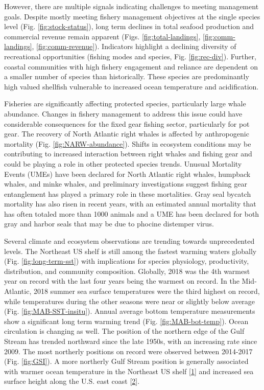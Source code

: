 \documentclass[10pt,]{article}
\begin{document}
However, there are multiple signals indicating challenges to meeting
management goals. Despite mostly meeting fishery management objectives
at the single species level (Fig. \ref{fig:stock-status}), long term
declines in total seafood production and commercial revenue remain
apparent (Figs. \ref{fig:total-landings}, \ref{fig:comm-landings},
\ref{fig:comm-revenue}). Indicators highlight a declining diversity of
recreational opportunities (fishing modes and species, Fig.
\ref{fig:rec-div}). Further, coastal communities with high fishery
engagement and reliance are dependent on a smaller number of species
than historically. These species are predominantly high valued shellfish
vulnerable to increased ocean temperature and acidification.

Fisheries are significantly affecting protected species, particularly
large whale abundance. Changes in fishery management to address this
issue could have considerable consequences for the fixed gear fishing
sector, particularly for pot gear. The recovery of North Atlantic right
whales is affected by anthropogenic mortality (Fig.
\ref{fig:NARW-abundance}). Shifts in ecosystem conditions may be
contributing to increased interaction between right whales and fishing
gear and could be playing a role in other protected species trends.
Unusual Mortality Events (UMEs) have been declared for North Atlantic
right whales, humpback whales, and minke whales, and preliminary
investigations suggest fishing gear entanglement has played a primary
role in these mortalities. Gray seal bycatch mortality has also risen in
recent years, with an estimated annual mortality that has often totaled
more than 1000 animals and a UME has been declared for both gray and
harbor seals that may be due to phocine distemper virus.

Several climate and ecosystem observations are trending towards
unprecedented levels. The Northeast US shelf is still among the fastest
warming waters globally (Fig. \ref{fig:long-term-sst}) with implications
for species physiology, productivity, distribution, and community
composition. Globally, 2018 was the 4th warmest year on record with the
last four years being the warmest on record. In the Mid-Atlantic, 2018
summer sea surface temperatures were the third highest on record, while
temperatures during the other seasons were near or slightly below
average (Fig. \ref{fig:MAB-SST-insitu}). Annual average bottom
temperature measurements show a significant long term warming trend
(Fig. \ref{fig:MAB-bot-temp}). Ocean circulation is changing as well.
The position of the northern edge of the Gulf Stream has trended
northward since the late 1950s, with an increasing rate since 2009. The
most northerly positions on record were observed between 2014-2017 (Fig.
\ref{fig:GSI}). A more northerly Gulf Stream position is generally
associated with warmer ocean temperature in the Northeast US shelf
{[}\protect\hyperlink{ref-zhang_role_2007}{1}{]} and increased sea
surface height along the U.S. east coast
{[}\protect\hyperlink{ref-goddard_extreme_2015}{2}{]}.
\end{document}
